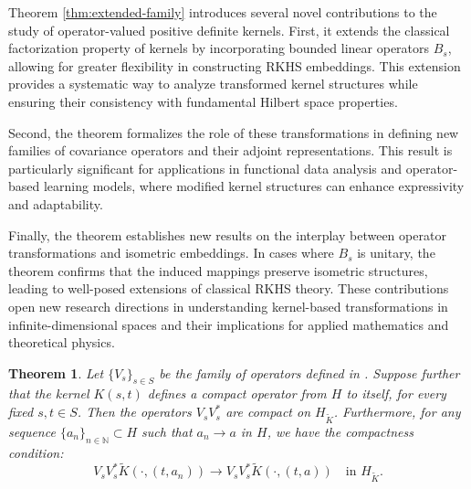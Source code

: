 \documentclass[11pt]{amsart}
\newtheorem{theorem}{Theorem}[section]
\theoremstyle{definition}
\numberwithin{equation}{section}
\begin{document}
\noindent
Theorem \ref{thm:extended-family} introduces several novel contributions to the study of operator-valued positive definite kernels. First, it extends the classical factorization property of kernels by incorporating bounded linear operators $B_s$, allowing for greater flexibility in constructing RKHS embeddings. This extension provides a systematic way to analyze transformed kernel structures while ensuring their consistency with fundamental Hilbert space properties.

Second, the theorem formalizes the role of these transformations in defining new families of covariance operators and their adjoint representations. This result is particularly significant for applications in functional data analysis and operator-based learning models, where modified kernel structures can enhance expressivity and adaptability.

Finally, the theorem establishes new results on the interplay between operator transformations and isometric embeddings. In cases where $B_s$ is unitary, the theorem confirms that the induced mappings preserve isometric structures, leading to well-posed extensions of classical RKHS theory. These contributions open new research directions in understanding kernel-based transformations in infinite-dimensional spaces and their implications for applied mathematics and theoretical physics.

\begin{theorem}\label{thm:compact}
Let \( \{V_s\}_{s \in S} \) be the family of operators defined in \cite[Theorem 3.1]{Jorgensen2024}. Suppose further that the kernel \( K(s,t) \) defines a compact operator from \( H \) to itself, for every fixed \( s, t \in S \). Then the operators \( V_s V_s^* \) are compact on \( H_{\tilde{K}} \). Furthermore, for any sequence \( \{a_n\}_{n \in \mathbb{N}} \subset H \) such that \( a_n \to a \) in \( H \), we have the compactness condition:
\[
V_s V_s^* \tilde{K}(\cdot, (t, a_n)) \to V_s V_s^* \tilde{K}(\cdot, (t, a)) \quad \text{in } H_{\tilde{K}}.
\]
\end{theorem}
\end{document}
